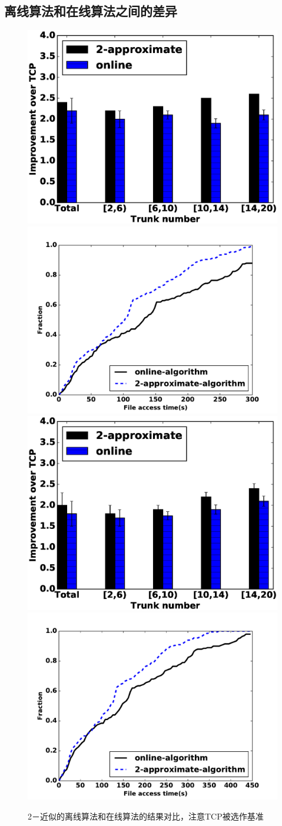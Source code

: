 \subsection{离线算法和在线算法之间的差异}
\begin{figure}[h]
  \centering%
    {\includegraphics[width=0.5\columnwidth]{figures/DTARGET/picture/evaluation/ex3/on_off_2.eps}}%
      {\includegraphics[width=0.5\columnwidth]{figures/DTARGET/picture/evaluation/ex3/online_offline.pdf}}
    {\includegraphics[width=0.5\columnwidth]{figures/DTARGET/picture/evaluation/ex3/on_off_3.eps}}%
      {\includegraphics[width=0.5\columnwidth]{figures/DTARGET/picture/evaluation/ex3/online_offline2.pdf}}
  \caption{2－近似的离线算法和在线算法的结果对比，注意TCP被选作基准}
  \label{loss_fig}
\end{figure}


